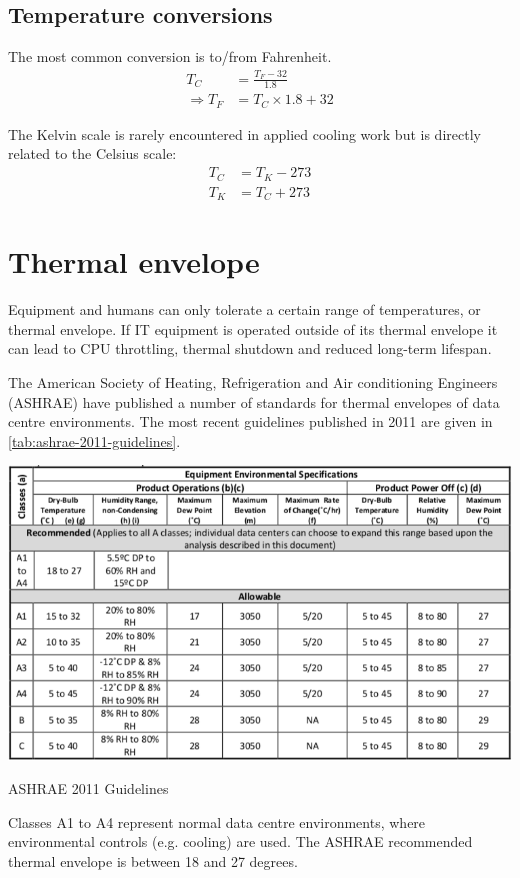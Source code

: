 \documentclass{pgnotes}
\begin{document}
\subsection{Temperature conversions}

The most common conversion is to/from Fahrenheit.
\begin{align}
  T_C & = \frac{T_F-32}{1.8} \label{eq:f-to-c} \\
  \Rightarrow  T_F & = T_C \times 1.8 + 32 \label{eq:c-to-f}
\end{align}

The Kelvin scale is rarely encountered in applied cooling work but is directly related to the Celsius scale:
\begin{align}
  T_C & = T_K - 273 \label{eq:k-to-c} \\
  T_K & = T_C + 273 \label{eq:c-to-k} 
\end{align}

\section{Thermal envelope}

Equipment and humans can only tolerate a certain range of temperatures, or thermal envelope.
If IT equipment is operated outside of its thermal envelope it can lead to CPU throttling, thermal shutdown and reduced long-term lifespan.

The American Society of Heating, Refrigeration and Air conditioning Engineers (ASHRAE) have published a number of standards for thermal envelopes of data centre environments.
The most recent guidelines published in 2011 are given in \autoref{tab:ashrae-2011-guidelines}.
\begin{table}[htbp]
  \centering
  \includegraphics[width=1.0\linewidth]{ashrae_2011_guidelines_celsius}
  \caption{ASHRAE 2011 Guidelines}
  \label{tab:ashrae-2011-guidelines}
\end{table}
Classes A1 to A4 represent normal data centre environments, where environmental controls (e.g. cooling) are used.
The ASHRAE recommended thermal envelope is between 18 and 27 degrees.
\end{document}
